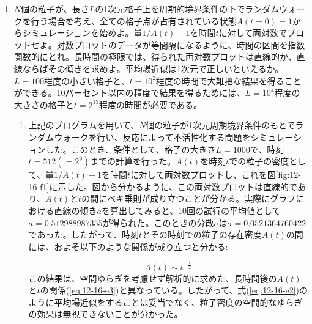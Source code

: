 \documentclass{jsarticle}
\begin{document}
        \begin{enumerate}
            \renewcommand{\labelenumi}{\alph{enumi}.}
            \renewcommand{\labelenumii}{}
            
            \item $N$個の粒子が、長さ$L$の1次元格子上を周期的境界条件の下でランダムウォークを行う場合を考え、全ての格子点が占有されている状態$A(t=0)=1$からシミュレーションを始めよ。量$1/A(t)-1$を時間$t$に対して両対数でプロットせよ。対数プロットのデータが等間隔になるように、時間の区間を指数関数的にとれ。長時間の極限では、得られた両対数プロットは直線的か、直線ならばその傾きを求めよ。平均場近似は1次元で正しいといえるか。$L=100$程度の小さい格子と、$t=10^{2}$程度の時間で大雑把な結果を得ることができる。10パーセント以内の精度で結果を得るためには、$L=10^{4}$程度の大きさの格子と$t=2^{13}$程度の時間が必要である。
                
                \begin{enumerate}
                    \item 上記のプログラムを用いて、$N$個の粒子が1次元周期境界条件のもとでランダムウォークを行い、反応によって不活性化する問題をシミュレーションした。このとき、条件として、格子の大きさ$L=1000$で、時刻$t=512(=2^{9})$までの計算を行った。$A(t)$を時刻$t$での粒子の密度として、量$1/A(t)-1$を時間$t$に対して両対数プロットし、これを図\ref{fig:12-16-f1}に示した。図から分かるように、この両対数プロットは直線的であり、$A(t)$と$t$の間にベキ乗則が成り立つことが分かる。実際にグラフにおける直線の傾き$a$を算出してみると、10回の試行の平均値として$a = 0.512988987355$が得られた。このときの分散$\sigma$は$\sigma = 0.0521364760422$であった。したがって、時刻$t$とその時刻での粒子の存在密度$A(t)$の間には、およそ以下のような関係が成り立つと分かる:
                    
                    \begin{equation}
                        A(t) \sim t^{-\frac{1}{2}}
                    \end{equation}
                    この結果は、空間ゆらぎを考慮せず解析的に求めた、長時間後の$A(t)$と$t$の関係(\ref{eq:12-16-e3})と異なっている。したがって、式(\ref{eq:12-16-e2})のように平均場近似をすることは妥当でなく、粒子密度の空間的なゆらぎの効果は無視できないことが分かった。
                    

\end{enumerate}
\end{enumerate}
\end{document}
